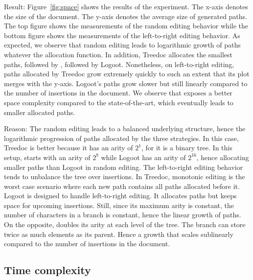 \begin{asparadesc}
\item [Result:] Figure~\ref{fig:space} shows the results of the experiment. The
  x-axis denotes the size of the document. The y-axis denotes the average size
  of generated paths. The top figure shows the measurements of the random
  editing behavior while the bottom figure shows the measurements of the
  left-to-right editing behavior. As expected, we observe that random editing
  leads to logarithmic growth of paths whatever the allocation function. In
  addition, Treedoc allocates the smallest paths, followed by \LSEQ, followed by
  Logoot. Nonetheless, on left-to-right editing, paths allocated by Treedoc grow
  extremely quickly to such an extent that its plot merges with the
  y-axis. Logoot's paths grow slower but still linearly compared to the number
  of insertions in the document. We observe that \LSEQ exposes a better space
  complexity compared to the state-of-the-art, which eventually leads to smaller
  allocated paths.
\item [Reason:] The random editing leads to a balanced underlying structure,
  hence the logarithmic progression of paths allocated by the three
  strategies. In this case, Treedoc is better because it has an arity of $2^1$,
  for it is a binary tree. In this setup, \LSEQ starts with an arity of $2^8$
  while Logoot has an arity of $2^{16}$, hence \LSEQ allocating smaller paths than
  Logoot in random editing. The left-to-right editing behavior tends to
  unbalance the tree over insertions. In Treedoc, monotonic editing is the worst
  case scenario where each new path contains all paths allocated before
  it. Logoot is designed to handle left-to-right editing. It allocates paths but
  keeps space for upcoming insertions. Still, since its maximum arity is
  constant, the number of characters in a branch is constant, hence the linear
  growth of paths. On the opposite, \LSEQ doubles its arity at each level of the
  tree. The branch can store twice as much elements as its parent. Hence a
  growth that scales sublinearly compared to the number of insertions in the
  document.
\end{asparadesc}

\subsection{Time complexity}


